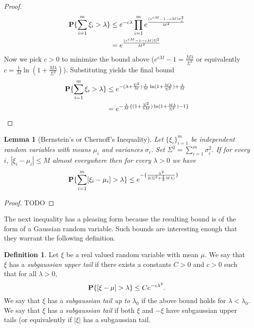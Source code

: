 \documentclass{amsart}
\newtheorem{lem}[thm]{Lemma}
\theoremstyle{remark}
\theoremstyle{definition}
\newtheorem{defn}[thm]{Definition}
\begin{document}
\begin{proof}
\begin{align*}
\textbf{P}\{\sum_{i=1}^m \xi_i > \lambda\} &\leq e^{-c\lambda} \prod_{i=1}^m
e^{\frac{(e^{cM} -1 - cM)\sigma_i^2}{M^2}} \\
& = e^{\frac{(e^{cM} -1 - cM)\Sigma^2}{M^2}}
\end{align*}
Now we pick $c>0$ to minimize the bound above ($e^{cM} -1 =
\frac{M\lambda}{\Sigma^2}$ or equivalently $c = \frac{1}{M}\ln(1 + \frac{M\lambda}{\Sigma^2})$).
Substituting yields the final bound
\begin{align*}
\textbf{P}\{\sum_{i=1}^m \xi_i > \lambda\} &\leq e^{-(\lambda + \frac{\Sigma^2}{M})
  \frac{1}{M}\ln(1 + \frac{M\lambda}{\Sigma^2}) + \frac{\lambda}{M}}
\\
& = e^{-\frac{\lambda}{M} \{
  (1+\frac{\Sigma^2}{\lambda M}) \ln(1 + \frac{M\lambda}{\Sigma^2}) -1
\}}
\end{align*}
\end{proof}

\begin{lem}[Bernstein's or Chernoff's Inequality]\label{Bernstein} Let
  $\{\xi_i\}_{i=1}^m$ be independent random variables with means
  $\mu_i$ and variances $\sigma_i$.  Set $\Sigma^2 = \sum_{i=1}^m
  \sigma_i^2$.  If for every $i$, $|\xi_i - \mu_i| \leq M$ almost
  everywhere then for every $\lambda > 0$ we have 
\begin{align*}
\textbf{P}\{\sum_{i=1}^m [\xi_i - \mu_i] > \lambda\} &\leq 
e^{
	-\{\frac{\lambda^2}{2(\Sigma^2 + \frac{1}{3}M\lambda)}\}
}
\end{align*}
\end{lem}
\begin{proof}
TODO
\end{proof}

The next inequality has a pleasing form because the resulting bound is
of the form of a Gaussian random variable.  Such bounds are
interesting enough that they warrant the following definition.
\begin{defn} Let $\xi$ be a real valued random variable with mean
  $\mu$.  We say that $\xi$ has a \emph{subgaussian upper tail} if there
  exists a  constants $C > 0$ and $c > 0$ such that for all $\lambda > 0$,
$$
\textbf{P}\{[\xi-\mu] > \lambda\} \leq Ce^{-c\lambda^2}.
$$
We say that $\xi$ has a \emph{subgaussian tail up to} $\lambda_0$ if the
above bound holds for $\lambda < \lambda_0$.  We say that $\xi$ has a
\emph{subgaussian tail} if both $\xi$ and $-\xi$ have subgaussian upper
tails (or equivalently if $|\xi|$ has a subgaussian tail.
\end{defn}
\end{document}
